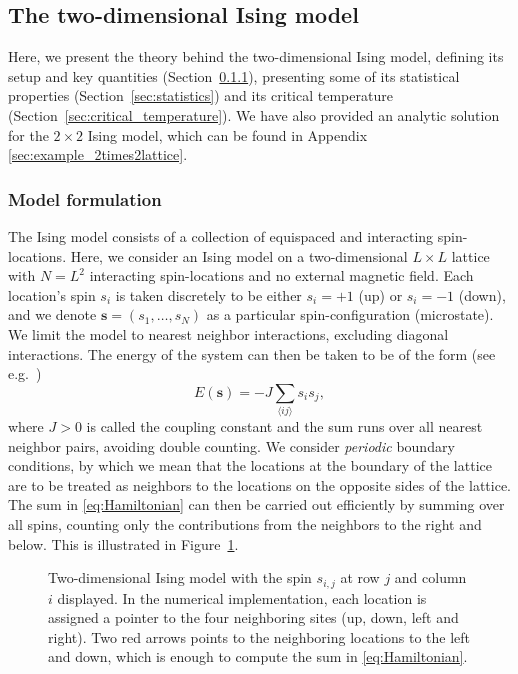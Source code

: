 \documentclass[english,notitlepage,reprint]{revtex4-2}  %
\renewcommand{\vec}[1]{\mathbf{#1}}
\begin{document}
\subsection{The two-dimensional Ising model}    \label{sec:two_dim_ising}
Here, we present the theory behind the two-dimensional Ising model, defining its setup and key quantities (Section~\ref{sec:ising_model_setup}), presenting some of its statistical properties (Section~\ref{sec:statistics}) and its critical temperature (Section~\ref{sec:critical_temperature}). We have also provided an analytic solution for the \(2\times 2\) Ising model, which can be found in Appendix \ref{sec:example_2times2lattice}.

\subsubsection{Model formulation}    \label{sec:ising_model_setup}
The Ising model consists of a collection of equispaced and interacting spin-locations. 
Here, we consider an Ising model on a two-dimensional \(L\times L\) lattice with \(N=L^2\) interacting spin-locations and no external magnetic field.
Each location's spin \(s_i\) is taken discretely to be either $s_i = +1$ (up) or $s_i = -1$ (down), and we denote $\vec{s} = (s_1,\dots, s_N)$ as a particular spin-configuration (microstate). 
We limit the model to nearest neighbor interactions, excluding diagonal interactions.
The energy of the system can then be taken to be of the form (see e.g.~\cite[p. 424]{IntroStatMekSwendsen})
\begin{equation}
    E(\vec{s}) = -J \sum_{\langle ij \rangle} s_i s_j,  \label{eq:Hamiltonian}
\end{equation}
where \(J>0\) is called the coupling constant and the sum runs over all nearest neighbor pairs, avoiding double counting.
We consider \emph{periodic} boundary conditions, by which we mean that the locations at the boundary of the lattice are to be treated as neighbors to the locations on the opposite sides of the lattice.
The sum in \eqref{eq:Hamiltonian} can then be carried out efficiently by summing over all spins, counting only the contributions from the neighbors to the right and below. 
This is illustrated in Figure~\ref{fig:counting_neighbors}.
\begin{figure}[h!]
    \centering
    
    \caption{Two-dimensional Ising model with the spin \(s_{i,j}\) at row \(j\) and column \(i\) displayed. In the numerical implementation, each location is assigned a pointer to the four neighboring sites (up, down, left and right). Two red arrows points to the neighboring locations to the left and down, which is enough to compute the sum in \eqref{eq:Hamiltonian}.}
    \label{fig:counting_neighbors}
\end{figure}
\end{document}
